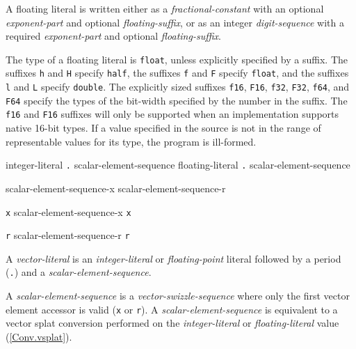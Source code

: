 \p A floating literal is written either as a \textit{fractional-constant} with
an optional \textit{exponent-part} and optional \textit{floating-suffix}, or as
an integer \textit{digit-sequence} with a required \textit{exponent-part} and
optional \textit{floating-suffix}.

\p The type of a floating literal is \texttt{float}, unless explicitly specified
by a suffix. The suffixes \texttt{h} and \texttt{H} specify \texttt{half}, the
suffixes \texttt{f} and \texttt{F} specify \texttt{float}, and the suffixes
\texttt{l} and \texttt{L} specify \texttt{double}. The explicitly sized suffixes
\texttt{f16}, \texttt{F16}, \texttt{f32}, \texttt{F32}, \texttt{f64}, and
\texttt{F64} specify the types of the bit-width specified by the number in the
suffix. The \texttt{f16} and \texttt{F16} suffixes will only be supported when
an implementation supports native 16-bit types. If a value specified in the
source is not in the range of representable values for its type, the program is
ill-formed.


\begin{grammar}
  \br
  integer-literal \texttt{.} scalar-element-sequence\br
  floating-literal \texttt{.} scalar-element-sequence

  \br
  scalar-element-sequence-x\br
  scalar-element-sequence-r

  \br
  \texttt{x}\br
  scalar-element-sequence-x \texttt{x}

  \br
  \texttt{r}\br
  scalar-element-sequence-r \texttt{r}
\end{grammar}

\p A \textit{vector-literal} is an \textit{integer-literal} or
\textit{floating-point} literal followed by a period (\texttt{.}) and a
\textit{scalar-element-sequence}.

\p A \textit{scalar-element-sequence} is a \textit{vector-swizzle-sequence}
where only the first vector element accessor is valid (\texttt{x} or
\texttt{r}). A \textit{scalar-element-sequence} is equivalent to a vector splat
conversion performed on the \textit{integer-literal} or
\textit{floating-literal} value (\ref{Conv.vsplat}).


\begin{grammar}
  \br
    
\end{grammar}

